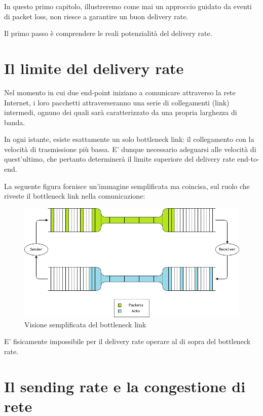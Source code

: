 
In questo primo capitolo, illustreremo come mai un approccio guidato da eventi di packet loss, non riesce a garantire un buon delivery rate. \bigskip

Il primo passo è comprendere le reali potenzialità del delivery rate.

\section{Il limite del delivery rate}

Nel momento in cui due end-point iniziano a comunicare attraverso la rete Internet, i loro pacchetti attraverseranno una serie di collegamenti (link) intermedi, ognuno dei quali sarà caratterizzato da una propria larghezza di banda. \bigskip


In ogni istante, esiste esattamente un solo bottleneck link: il collegamento con la velocità di trasmissione più bassa. E' dunque necessario adeguarsi alle velocità di quest'ultimo, che pertanto determinerà il limite superiore del delivery rate end-to-end. \bigskip

La seguente figura fornisce un'immagine semplificata ma coincisa, sul ruolo che riveste il bottleneck link nella comunicazione:

\begin{figure}[H]

\center
\caption{Visione semplificata del bottleneck link}
\includegraphics[scale=0.7]{chapters/2_failed/img/bottleneck_link}

\end{figure}

E' fisicamente impossibile per il delivery rate operare al di sopra del bottleneck rate. 

\section{Il sending rate e la congestione di rete}

